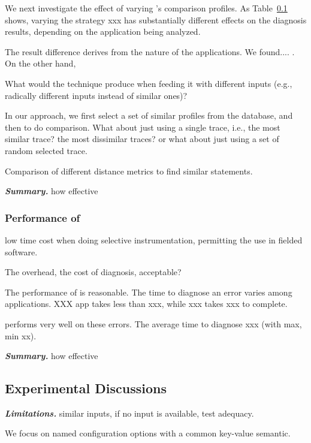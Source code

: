 We next investigate the effect of varying \ourtool's
comparison profiles. As Table~\ref{} shows, varying the
strategy xxx has substantially different effects on the
diagnosis results, depending on the application being analyzed.

The result difference derives from the nature of the applications.
We found....  . On the other hand,


What would the technique produce when feeding it with different inputs (e.g.,
radically different inputs instead of similar ones)?

In our approach, we first select a set of similar profiles from the  database,
and then to do comparison. What about just using a single trace, i.e., the
most similar trace? the most dissimilar traces? or what about just using a set
of random selected trace.

Comparison of different distance metrics to find similar statements.

\vspace{1mm}
\noindent \textbf{\textit{Summary.}} how effective

\subsubsection{Performance of \ourtool}
low time cost when doing
selective instrumentation, permitting the use in fielded software.

The overhead, the cost of diagnosis, acceptable?

The performance of \ourtool is reasonable. The time to diagnose
an error varies among applications.  XXX app takes less than xxx,
while xxx takes xxx to complete.

\ourtool performs very well on these errors. The average time
to diagnose xxx (with max, min xx).

\vspace{1mm}
\noindent \textbf{\textit{Summary.}} how effective

\vspace{1mm}

\subsection{Experimental Discussions}


\noindent \textbf{\textit{Limitations.}} similar inputs, if no input is available, test adequacy.

We focus on named configuration options with a common key-value semantic.

